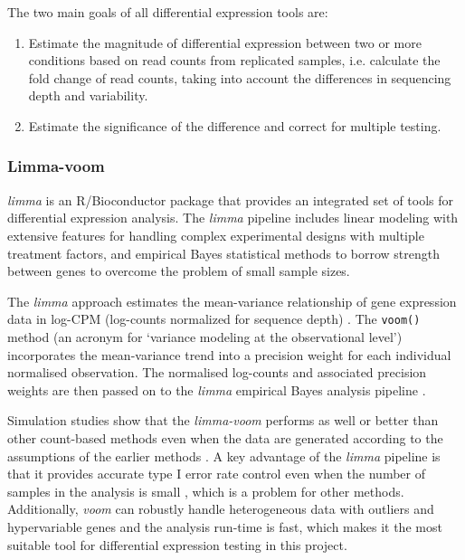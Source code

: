     The two main goals of all differential expression tools are:
    \begin{enumerate}
    \item Estimate the magnitude of differential expression between two or more conditions based on read counts from replicated samples, i.e. calculate the fold change of read counts, taking into account the differences in sequencing depth and variability.
    \item Estimate the significance of the difference and correct for multiple testing.
    \end{enumerate}

        
        \subsubsection{Limma-voom}
        \textit{limma} is an R/Bioconductor package \cite{Ritchie2015LimmaStudies, smyth2004linear}  that provides an integrated set of tools for differential expression analysis. The \textit{limma} pipeline includes linear modeling with extensive features for handling complex experimental designs with multiple treatment factors, and empirical Bayes statistical methods to borrow strength between genes to overcome the problem of small sample sizes.

        The \textit{limma} approach estimates the mean-variance relationship of gene expression data in log-CPM  (log-counts normalized for sequence depth) \cite{Law2014}. The \texttt{voom()} method (an acronym for ‘variance modeling at the observational level’) incorporates the mean-variance trend into a precision weight for each individual normalised observation. The normalised log-counts and associated precision weights are then passed on to the \textit{limma} empirical Bayes analysis pipeline \cite{Law2014}.
        
        Simulation studies show that the \textit{limma-voom} performs as well or better than other count-based methods even when the data are generated according to the assumptions of the earlier methods  \cite{Law2014}. A key advantage of the \textit{limma} pipeline is that it provides accurate type I error rate control even when the number of samples in the analysis is small \cite{SmythLimma:Guide}, which is a problem for other methods. Additionally, \textit{voom} can robustly handle heterogeneous data with outliers and hypervariable genes \cite{phipson2013empirical} and the analysis run-time is fast, which makes it the most suitable tool for differential expression testing in this project. 
        

